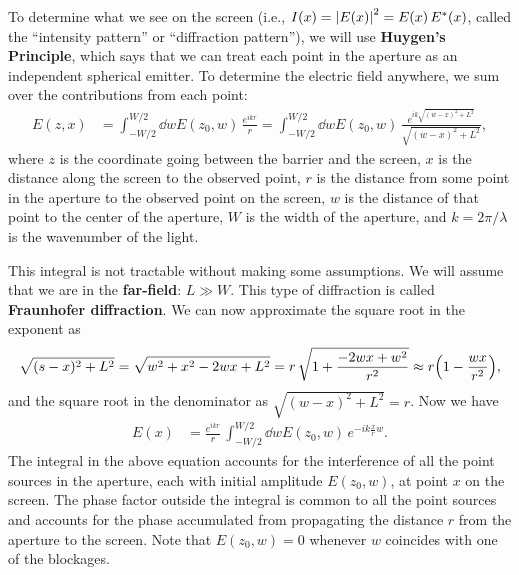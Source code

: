 \documentclass[]{manual}
\begin{document}
    To determine what we see on the screen (i.e., $I(x) = \abs{E(x)}^2 = E(x) \, E^*(x)$, called the ``intensity pattern'' or ``diffraction pattern''), we will use \textbf{Huygen's Principle}, which says that we can treat each point in the aperture as an independent spherical emitter.
    To determine the electric field anywhere, we sum over the contributions from each point:
    \begin{align}
    E(z, x) &= \int^{W/2}_{-W/2} \dd{w} E(z_0, w) \, \frac{e^{i k r}}{r} = \int^{W/2}_{-W/2} \dd{w} E(z_0, w) \, \frac{e^{i k \sqrt{(w-x)^2 + L^2}}}{\sqrt{(w-x)^2 + L^2}},
    \end{align}
    where $z$ is the coordinate going between the barrier and the screen, $x$ is the distance along the screen to the observed point, $r$ is the distance from some point in the aperture to the observed point on the screen, $w$ is the distance of that point to the center of the aperture, $W$ is the width of the aperture, and $k = 2 \pi / \lambda$ is the wavenumber of the light.  
    
    This integral is not tractable without making some assumptions.
    We will assume that we are in the \textbf{far-field}: $L \gg W$.
    This type of diffraction is called \textbf{Fraunhofer diffraction}.
    We can now approximate the square root in the exponent as
    \begin{align} \label{eqn:fraunhoffer-square-root-approx}
    \sqrt{(s-x)^2 + L^2} = \sqrt{w^2 + x^2 - 2wx + L^2} = r \, \sqrt{1 + \frac{-2wx + w^2}{r^2}} \approx r \qty(1 - \frac{wx}{r^2}),
    \end{align}
    and the square root in the denominator as $\sqrt{(w-x)^2 + L^2} = r$. 
    Now we have
    \begin{align} \label{eqn:fraunhofer-diffraction-integral}
    E(x) &= \frac{e^{i k r}}{r} \, \int^{W/2}_{-W/2} \dd{w} E(z_0, w) \, e^{-i k \frac{x}{r} w}.
    \end{align}
    The integral in the above equation accounts for the interference of all the point sources in the aperture, each with initial amplitude $E(z_0, w)$, at point $x$ on the screen.  The phase factor outside the integral is common to all the point sources and accounts for the phase accumulated from propagating the distance $r$ from the aperture to the screen. Note that $E(z_0, w)=0$ whenever $w$ coincides with one of the blockages.
\end{document}
